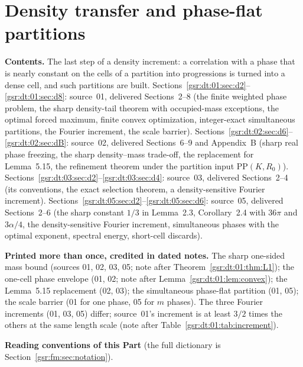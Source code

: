 \documentclass[11pt,letterpaper]{article}
\numberwithin{equation}{section}
\theoremstyle{definition}
\theoremstyle{remark}
\newcommand{\1}{\mathbf 1}
\newcommand{\partsource}[1]{\par\noindent\begin{minipage}{\textwidth}\small #1\end{minipage}\par\medskip}
\begin{document}
\part{Density transfer and phase-flat partitions}\label{gsr:dt:part}
\partsource{
\textbf{Contents.} The last step of a density increment: a correlation with a phase that is nearly constant on the cells of a partition into progressions is turned into a dense cell, and such partitions are built. Sections~\ref{gsr:dt:01:sec:d2}--\ref{gsr:dt:01:sec:d8}: source~01, delivered Sections~2--8 (the finite weighted phase problem, the sharp density-tail theorem with occupied-mass exceptions, the optimal forced maximum, finite convex optimization, integer-exact simultaneous partitions, the Fourier increment, the scale barrier). Sections~\ref{gsr:dt:02:sec:d6}--\ref{gsr:dt:02:sec:dB}: source~02, delivered Sections~6--9 and Appendix~B (sharp real phase freezing, the sharp density--mass trade-off, the replacement for Lemma~5.15, the refinement theorem under the partition input $\mathrm{PP}(K,R_0)$). Sections~\ref{gsr:dt:03:sec:d2}--\ref{gsr:dt:03:sec:d4}: source~03, delivered Sections~2--4 (its conventions, the exact selection theorem, a density-sensitive Fourier increment). Sections~\ref{gsr:dt:05:sec:d2}--\ref{gsr:dt:05:sec:d6}: source~05, delivered Sections~2--6 (the sharp constant $1/3$ in Lemma~2.3, Corollary~2.4 with $36\pi$ and $3\alpha/4$, the density-sensitive Fourier increment, simultaneous phases with the optimal exponent, spectral energy, short-cell discards).

\textbf{Printed more than once, credited in dated notes.} The sharp one-sided mass bound (sources 01, 02, 03, 05; note after Theorem~\ref{gsr:dt:01:thm:L1}); the one-cell phase envelope (01, 02; note after Lemma~\ref{gsr:dt:01:lem:convex}); the Lemma~5.15 replacement (02, 03); the simultaneous phase-flat partition (01, 05); the scale barrier (01 for one phase, 05 for $m$ phases). The three Fourier increments (01, 03, 05) differ; source~01's increment is at least $3/2$ times the others at the same length scale (note after Table~\ref{gsr:dt:01:tab:increment}).
}
\noindent\textbf{Reading conventions of this Part} (the full dictionary is Section~\ref{gsr:fm:sec:notation}).
\end{document}
